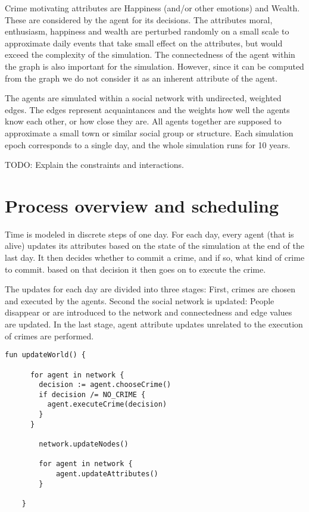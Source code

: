 \documentclass{article}
\begin{document}
		Crime motivating attributes are Happiness (and/or other emotions) and Wealth. These are
		considered by the agent for its decisions. The attributes
		moral, enthusiasm, happiness and wealth are perturbed randomly on a small scale to
		approximate daily events that take small effect on the attributes, but would exceed the
		complexity of the simulation.
		The connectedness of the agent within the graph is also important for the simulation.
		However, since it can be computed from the graph we do not consider it as an inherent
		attribute of the agent.
		\par
		The agents are simulated within a social network with undirected, weighted edges.
		The edges represent acquaintances and the weights how well the agents know each other,
		or how close they are.
		All agents together are supposed to approximate a small town or similar social group or
		structure. Each simulation epoch corresponds to a single day, and the whole simulation
		runs for 10 years.
		\\\par
		TODO: Explain the constraints and interactions.

	\section{Process overview and scheduling}
		Time is modeled in discrete steps of one day. For each day, every agent (that is alive)
		updates its attributes based on the state of the simulation at the end of the last day.
		It then decides whether to commit a crime, and if so, what kind of crime to commit. based
		on that decision it then goes on to execute the crime.
		\par
		The updates for each day are divided into three stages: First, crimes are chosen and
		executed by the agents. Second the social network is updated: People disappear or are
		introduced to the network and connectedness and edge values are updated. In the last
		stage, agent attribute updates unrelated to the execution of crimes are performed.

		\begin{lstlisting}[caption=The daily global update routine, label=l_global_update]
	fun updateWorld() {

	  for agent in network {
		decision := agent.chooseCrime()
		if decision /= NO_CRIME {
		  agent.executeCrime(decision)
		}
	  }

		network.updateNodes()

		for agent in network {
			agent.updateAttributes()
		}

	}
		\end{lstlisting}
\end{document}
